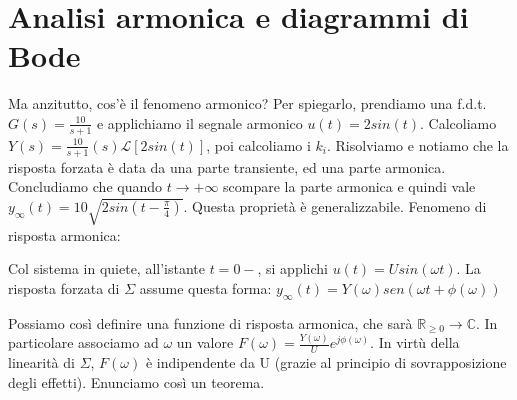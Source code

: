\documentclass[11pt]{article}
\begin{document}
\section{Analisi armonica e diagrammi di Bode}
Ma anzitutto, cos'è il fenomeno armonico? Per spiegarlo, prendiamo una f.d.t. $G(s) = \frac{10}{s+1}$ e applichiamo il segnale armonico $u(t) = 2sin(t)$. Calcoliamo $Y(s)=\frac{10}{s+1}(s)\mathcal{L}[2sin(t)]$, poi calcoliamo i $k_i$. Risolviamo e notiamo che la risposta forzata è data da una parte transiente, ed una parte armonica. Concludiamo che quando $t\rightarrow+\infty$ scompare la parte armonica e quindi vale $y_\infty(t) = 10\sqrt{2sin\left(t-\frac{\pi}{4}\right)}$. Questa proprietà è generalizzabile. Fenomeno di risposta armonica:
\begin{center}
    Col sistema in quiete, all'istante $t=0-$, si applichi $u(t)=Usin(\omega t)$. La risposta forzata di $\Sigma$ assume questa forma: $y_\infty(t) = Y(\omega) sen(\omega t + \phi(\omega))$
\end{center}
Possiamo così definire una funzione di risposta armonica, che sarà $\mathbb{R}_{\ge0}\rightarrow\mathbb{C}$. In particolare associamo ad $\omega$ un valore $F(\omega)=\frac{Y(\omega)}{U}e^{j\phi(\omega)}$. In virtù della linearità di $\Sigma$, $F(\omega)$ è indipendente da U (grazie al principio di sovrapposizione degli effetti).
Enunciamo così un teorema.
\end{document}

